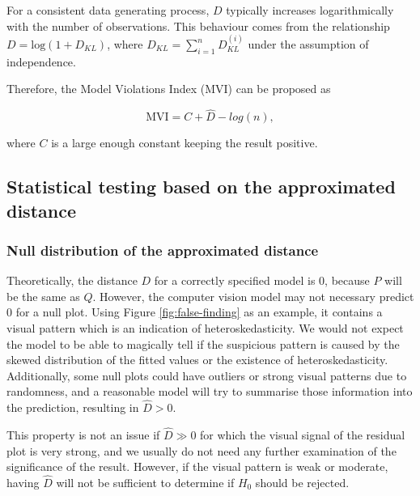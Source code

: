 \documentclass[]{interact}
\theoremstyle{plain}%
\theoremstyle{definition}
\theoremstyle{remark}
\begin{document}
For a consistent data generating process, \(D\) typically increases
logarithmically with the number of observations. This behaviour comes
from the relationship \(D = \text{log}(1 + D_{KL})\), where
\(D_{KL} = \sum_{i=1}^{n}D_{KL}^{(i)}\) under the assumption of
independence.

Therefore, the Model Violations Index (MVI) can be proposed as

\begin{equation}
\label{eq:mvi}
\text{MVI} = C + \hat{D} - log(n),
\end{equation}

\noindent where \(C\) is a large enough constant keeping the result
positive.

\hypertarget{statistical-testing-based-on-the-approximated-distance}{%
\subsection{Statistical testing based on the approximated
distance}\label{statistical-testing-based-on-the-approximated-distance}}

\hypertarget{null-distribution-of-the-approximated-distance}{%
\subsubsection{Null distribution of the approximated
distance}\label{null-distribution-of-the-approximated-distance}}

Theoretically, the distance \(D\) for a correctly specified model is
\(0\), because \(P\) will be the same as \(Q\). However, the computer
vision model may not necessary predict \(0\) for a null plot. Using
Figure \ref{fig:false-finding} as an example, it contains a visual
pattern which is an indication of heteroskedasticity. We would not
expect the model to be able to magically tell if the suspicious pattern
is caused by the skewed distribution of the fitted values or the
existence of heteroskedasticity. Additionally, some null plots could
have outliers or strong visual patterns due to randomness, and a
reasonable model will try to summarise those information into the
prediction, resulting in \(\hat{D} > 0\).

This property is not an issue if \(\hat{D} \gg 0\) for which the visual
signal of the residual plot is very strong, and we usually do not need
any further examination of the significance of the result. However, if
the visual pattern is weak or moderate, having \(\hat{D}\) will not be
sufficient to determine if \(H_0\) should be rejected.
\end{document}
